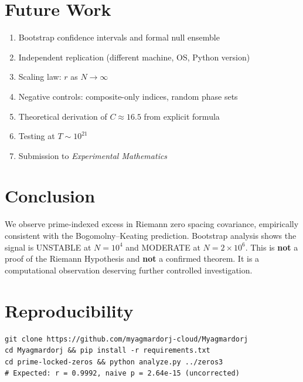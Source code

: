 \documentclass[11pt]{article}
\begin{document}
\section{Future Work}

\begin{enumerate}[label=\arabic*.]
\item Bootstrap confidence intervals and formal null ensemble
\item Independent replication (different machine, OS, Python version)
\item Scaling law: $r$ as $N \to \infty$
\item Negative controls: composite-only indices, random phase sets
\item Theoretical derivation of $C \approx 16.5$ from explicit formula
\item Testing at $T \sim 10^{21}$
\item Submission to \textit{Experimental Mathematics}
\end{enumerate}

\section{Conclusion}

We observe prime-indexed excess in Riemann zero spacing covariance,
empirically consistent with the Bogomolny--Keating prediction.
Bootstrap analysis shows the signal is UNSTABLE at $N=10^4$ and MODERATE at $N=2\times10^6$.
This is \textbf{not} a proof of the Riemann Hypothesis and
\textbf{not} a confirmed theorem.
It is a computational observation deserving further controlled investigation.

\section*{Reproducibility}
\begin{verbatim}
git clone https://github.com/myagmardorj-cloud/Myagmardorj
cd Myagmardorj && pip install -r requirements.txt
cd prime-locked-zeros && python analyze.py ../zeros3
# Expected: r = 0.9992, naive p = 2.64e-15 (uncorrected)
\end{verbatim}
\end{document}
